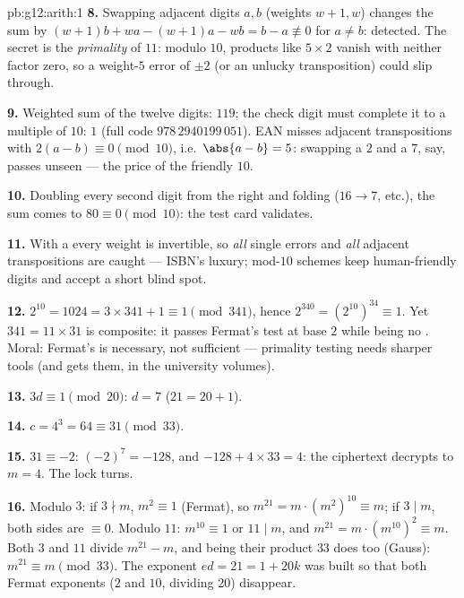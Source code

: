 \begin{solution}{pb:g12:arith:1}
\textbf{8.} Swapping adjacent digits $a, b$ (weights
$w + 1, w$) changes the sum by
$(w+1)b + wa - (w+1)a - wb = b - a \not\equiv 0$ for
$a \neq b$: detected. The secret is the \emph{primality} of
$11$: modulo $10$, products like $5 \times 2$ vanish with
neither factor zero, so a weight-$5$ error of $\pm 2$ (or an
unlucky transposition) could slip through.

\textbf{9.} Weighted sum of the twelve digits: $119$; the
check digit must complete it to a multiple of $10$: $1$ (full
code $978\,2940199\,051$). EAN misses adjacent transpositions
with $2(a - b) \equiv 0 \pmod{10}$, i.e.\
$\abs{a - b} = 5$: swapping a $2$ and a $7$, say, passes
unseen --- the price of the friendly  $10$.

\textbf{10.} Doubling every second digit from the right and
folding ($16 \to 7$, etc.), the sum comes to $80 \equiv 0
\pmod{10}$: the test card validates.

\textbf{11.} With a   every weight is invertible,
so \emph{all} single errors and \emph{all} adjacent
transpositions are caught --- ISBN's luxury; mod-$10$ schemes
keep human-friendly digits and accept a short blind spot.

\textbf{12.} $2^{10} = 1024 = 3 \times 341 + 1 \equiv 1
\pmod{341}$, hence $2^{340} = \left(2^{10}\right)^{34} \equiv
1$. Yet $341 = 11 \times 31$ is composite: it passes Fermat's
test at base $2$ while being no . Moral: Fermat's
\omterm{def:g12:arith:congruence}{congruence} is necessary, not sufficient --- primality testing
needs sharper tools (and gets them, in the university
volumes).

\textbf{13.} $3d \equiv 1 \pmod{20}$: $d = 7$
($21 = 20 + 1$).

\textbf{14.} $c = 4^3 = 64 \equiv 31 \pmod{33}$.

\textbf{15.} $31 \equiv -2$: $(-2)^7 = -128$, and
$-128 + 4 \times 33 = 4$: the ciphertext decrypts to
$m = 4$. The lock turns.

\textbf{16.} Modulo $3$: if $3 \nmid m$,
$m^2 \equiv 1$ (Fermat), so
$m^{21} = m \cdot \left(m^2\right)^{10} \equiv m$; if
$3 \mid m$, both sides are $\equiv 0$. Modulo $11$:
$m^{10} \equiv 1$ or $11 \mid m$, and
$m^{21} = m \cdot \left(m^{10}\right)^2 \equiv m$. Both $3$
and $11$ divide $m^{21} - m$, and being  their product
$33$ does too (Gauss): $m^{21} \equiv m \pmod{33}$. The
exponent $ed = 21 = 1 + 20k$ was built so that both Fermat
exponents ($2$ and $10$, dividing $20$) disappear.


\end{solution}
